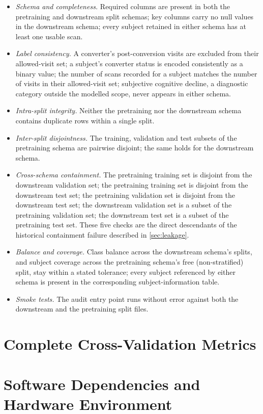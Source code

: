 \begin{itemize}
  \item \emph{Schema and completeness.} Required columns are present in both the
  pretraining and downstream split schemas; key columns carry no null values in the
  downstream schema; every subject retained in either schema has at least one usable scan.
  \item \emph{Label consistency.} A converter's post-conversion visits are excluded from
  their allowed-visit set; a subject's converter status is encoded consistently as a binary
  value; the number of scans recorded for a subject matches the number of visits in their
  allowed-visit set; subjective cognitive decline, a diagnostic category outside the
  modelled scope, never appears in either schema.
  \item \emph{Intra-split integrity.} Neither the pretraining nor the downstream schema
  contains duplicate rows within a single split.
  \item \emph{Inter-split disjointness.} The training, validation and test subsets of the
  pretraining schema are pairwise disjoint; the same holds for the downstream schema.
  \item \emph{Cross-schema containment.} The pretraining training set is disjoint from the
  downstream validation set; the pretraining training set is disjoint from the downstream
  test set; the pretraining validation set is disjoint from the downstream test set; the
  downstream validation set is a subset of the pretraining validation set; the downstream
  test set is a subset of the pretraining test set. These five checks are the direct
  descendants of the historical containment failure described in \autoref{sec:leakage}.
  \item \emph{Balance and coverage.} Class balance across the downstream schema's splits,
  and subject coverage across the pretraining schema's free (non-stratified) split, stay
  within a stated tolerance; every subject referenced by either schema is present in the
  corresponding subject-information table.
  \item \emph{Smoke tests.} The audit entry point runs without error against both the
  downstream and the pretraining split files.
\end{itemize}

\chapter{Complete Cross-Validation Metrics}\label{ch:app-metrics}

\chapter{Software Dependencies and Hardware Environment}\label{ch:app-environment}
